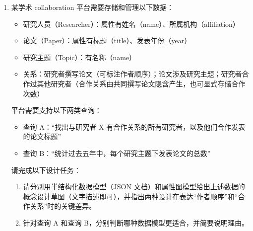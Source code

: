 \documentclass[UTF8,a4paper,11pt]{ctexart}
\begin{document}
\begin{enumerate}

\item 某学术 collaboration 平台需要存储和管理以下数据：

\begin{itemize}
\item 研究人员（Researcher）：属性有姓名（name）、所属机构（affiliation）
\item 论文（Paper）：属性有标题（title）、发表年份（year）
\item 研究主题（Topic）：有名称（name）
\item 关系：研究者撰写论文（可标注作者顺序）；论文涉及研究主题；研究者合作过其他研究者（合作关系由共同撰写论文隐含产生，也可显式存储合作次数）
\end{itemize}

平台需要支持以下两类查询：

\begin{itemize}
\item 查询 A：“找出与研究者 X 有合作关系的所有研究者，以及他们合作发表的论文标题”
\item 查询 B：“统计过去五年中，每个研究主题下发表论文的总数”
\end{itemize}

请完成以下设计任务：

\begin{enumerate}
\item 请分别用半结构化数据模型（JSON 文档）和属性图模型给出上述数据的概念设计草图（文字描述即可），并指出两种设计在表达“作者顺序”和“合作关系”时的关键差异。
\item 针对查询 A 和查询 B，分别判断哪种数据模型更适合，并简要说明理由。
\end{enumerate}


\end{enumerate}
\end{document}
